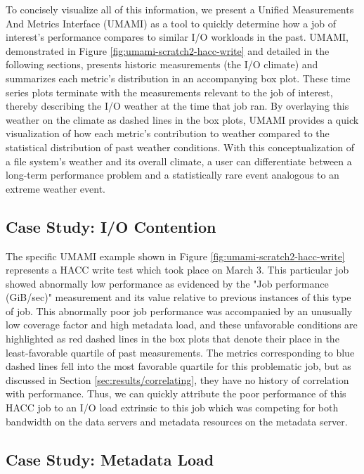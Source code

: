 To concisely visualize all of this information, we present a Unified Measurements And Metrics Interface (UMAMI) as a tool to quickly determine how a job of interest's performance compares to similar I/O workloads in the past.
UMAMI, demonstrated in Figure \ref{fig:umami-scratch2-hacc-write} and detailed in the following sections, presents historic measurements (the I/O climate) and summarizes each metric's distribution in an accompanying box plot.
These time series plots terminate with the measurements relevant to the job of interest, thereby describing the I/O weather at the time that job ran.
By overlaying this weather on the climate as dashed lines in the box plots, UMAMI provides a quick visualization of how each metric's contribution to weather compared to the statistical distribution of past weather conditions.
With this conceptualization of a file system's weather and its overall climate, a user can differentiate between a long-term performance problem and a statistically rare event analogous to an extreme weather event.


\subsection{Case Study: I/O Contention}

The specific UMAMI example shown in Figure \ref{fig:umami-scratch2-hacc-write} represents a HACC write test which took place on March 3.
This particular job showed abnormally low performance as evidenced by the "Job performance (GiB/sec)" measurement and its value relative to previous instances of this type of job.
This abnormally poor job performance was accompanied by an unusually low coverage factor and high metadata load, and these unfavorable conditions are highlighted as red dashed lines in the box plots that denote their place in the least-favorable quartile of past measurements.
The metrics corresponding to blue dashed lines fell into the most favorable quartile for this problematic job, but as discussed in Section \ref{sec:results/correlating}, they have no history of correlation with performance.
Thus, we can quickly attribute the poor performance of this HACC job to an I/O load extrinsic to this job which was competing for both bandwidth on the data servers and metadata resources on the metadata server.

\subsection{Case Study: Metadata Load}

